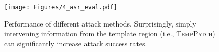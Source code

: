 \begin{figure}[t!]
  \centering
  \texttt{[image: Figures/4\_asr\_eval.pdf]}
  \caption{Performance of different attack methods. Surprisingly, simply intervening information from the template region (i.e., \textsc{TempPatch}) can significantly increase attack success rates.}
  \label{fig:asr_eval}
\end{figure}
